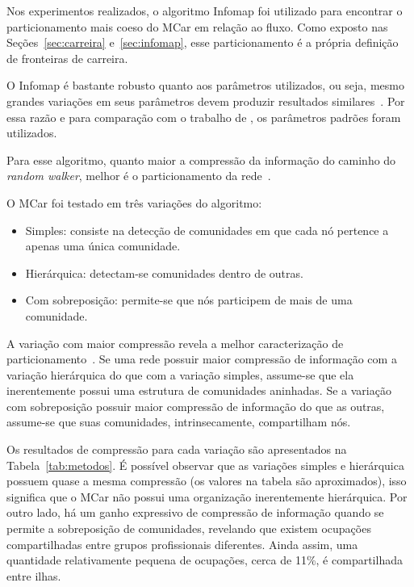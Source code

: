 \documentclass[
  article,
  11pt,
  a4paper,
  english,
  brazil,
  sumario=tradicional]{abntex2}
\begin{document}

Nos experimentos realizados, o algoritmo Infomap foi utilizado para encontrar o particionamento mais coeso do MCar em relação ao fluxo. Como exposto nas Seções~\ref{sec:carreira} e~\ref{sec:infomap}, esse particionamento é a própria definição de fronteiras de carreira.

O Infomap é bastante robusto quanto aos parâmetros utilizados, ou seja, mesmo grandes variações em seus parâmetros devem produzir resultados similares~\cite{Kawamoto2015-ha,Lambiotte2012-fp}. Por essa razão e para comparação com o trabalho de , os parâmetros padrões foram utilizados.

Para esse algoritmo, quanto maior a compressão da informação do caminho do \textit{random walker}, melhor é o particionamento da rede~\cite{Rosvall2009-sd}.

O MCar foi testado em três variações do algoritmo: 
\begin{itemize}
\item Simples: consiste na detecção de comunidades em que cada nó pertence a apenas uma única comunidade. 
\item Hierárquica: detectam-se comunidades dentro de outras. 
\item Com sobreposição: permite-se que nós participem de mais de uma comunidade.
\end{itemize}

A variação com maior compressão revela a melhor caracterização de particionamento~\cite{Viamontes_Esquivel2011-it,Rosvall2011-yi}. Se uma rede possuir maior compressão de informação com a variação hierárquica do que com a variação simples, assume-se que ela inerentemente possui uma estrutura de comunidades aninhadas. Se a variação com sobreposição possuir maior compressão de informação do que as outras, assume-se que suas comunidades, intrinsecamente, compartilham nós.

Os resultados de compressão para cada variação são apresentados na Tabela~\ref{tab:metodos}. É possível observar que as variações simples e hierárquica possuem quase a mesma compressão (os valores na tabela são aproximados), isso significa que o MCar não possui uma organização inerentemente hierárquica. Por outro lado, há um ganho expressivo de compressão de informação quando se permite a sobreposição de comunidades, revelando que existem ocupações compartilhadas entre grupos profissionais diferentes. Ainda assim, uma quantidade relativamente pequena de ocupações, cerca de 11\%, é compartilhada entre ilhas.
\end{document}
